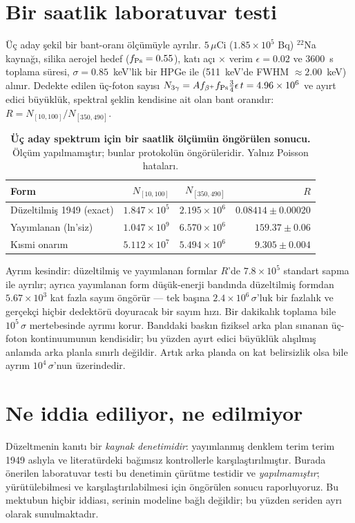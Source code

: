 \documentclass[11pt,a4paper]{article}
\begin{document}
\section{Bir saatlik laboratuvar testi}
Üç aday şekil bir bant-oranı ölçümüyle ayrılır. $5\,\mu$Ci
($1.85\times10^5$ Bq) $^{22}$Na kaynağı, silika aerojel hedef
($f_{\rm Ps} = 0.55$), katı açı $\times$ verim $\epsilon = 0.02$ ve
$3600$~s toplama süresi, $\sigma = 0.85$~keV'lik bir HPGe ile
(511~keV'de FWHM $\approx 2.00$~keV) alınır. Dedekte edilen üç-foton
sayısı
$N_{3\gamma} = A f_{\beta^+} f_{\rm Ps} \tfrac{3}{4}\epsilon\,t = 4.96\times 10^{6}$
ve ayırt edici büyüklük, spektral şeklin kendisine ait olan bant oranıdır:
$R = N_{[10,100]}/N_{[350,490]}$.

\begin{table}[!htbp]
\centering\footnotesize
\setlength{\tabcolsep}{4pt}
\caption{\textbf{Üç aday spektrum için bir saatlik ölçümün öngörülen sonucu.}
Ölçüm yapılmamıştır; bunlar protokolün öngörüleridir. Yalnız Poisson
hataları.}
\label{tab:na22}
\vspace{0.1cm}
\begin{tabular}{@{}lrrr@{}}
\toprule
Form & $N_{[10,100]}$ & $N_{[350,490]}$ & $R$ \\
\midrule
Düzeltilmiş 1949 (exact) & $1.847\times 10^{5}$ & $2.195\times 10^{6}$ & $0.08414\pm 0.00020$ \\
Yayımlanan (ln'siz) & $1.047\times 10^{9}$ & $6.570\times 10^{6}$ & $159.37\pm 0.06$ \\
Kısmi onarım & $5.112\times 10^{7}$ & $5.494\times 10^{6}$ & $9.305\pm 0.004$ \\
\bottomrule
\end{tabular}
\end{table}

Ayrım kesindir: düzeltilmiş ve yayımlanan formlar $R$'de
$7.8\times 10^{5}$ standart sapma ile ayrılır; ayrıca yayımlanan form
düşük-enerji bandında düzeltilmiş formdan $5.67\times 10^{3}$ kat fazla
sayım öngörür --- tek başına $2.4\times10^{6}\,\sigma$'luk bir fazlalık ve
gerçekçi hiçbir dedektörü doyuracak bir sayım hızı. Bir dakikalık
toplama bile $10^{5}\,\sigma$ mertebesinde ayrımı korur. Banddaki
baskın fiziksel arka plan sınanan üç-foton kontinuumunun kendisidir;
bu yüzden ayırt edici büyüklük alışılmış anlamda arka planla
sınırlı değildir. Artık arka planda on kat belirsizlik olsa bile ayrım
$10^{4}\,\sigma$'nun üzerindedir.

\section{Ne iddia ediliyor, ne edilmiyor}
Düzeltmenin kanıtı bir \emph{kaynak denetimidir}: yayımlanmış denklem
terim terim 1949 aslıyla ve literatürdeki bağımsız kontrollerle
karşılaştırılmıştır. Burada önerilen laboratuvar testi bu denetimin
çürütme testidir ve \emph{yapılmamıştır}; yürütülebilmesi ve
karşılaştırılabilmesi için öngörülen sonucu raporluyoruz. Bu mektubun
hiçbir iddiası, serinin modeline bağlı değildir; bu yüzden seriden ayrı
olarak sunulmaktadır.
\end{document}
